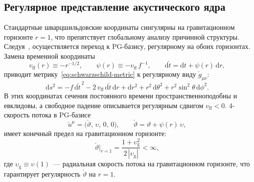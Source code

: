 \documentclass[12pt,a4paper,preprint]{elsarticle}
\begin{document}
        \subsection{Регулярное представление акустического ядра}\label{subsec:pg-core}
            Стандартные шварцшильдовские координаты сингулярны на гравитационном горизонте $r = 1$, что препятствует глобальному анализу причинной структуры. Следуя~\cite{SemyannikovAV_GlobalAcousticGeometryOfMichelFlowInPainleveGullstrandCoordinates_2026}, осуществляется переход к PG-базису, регулярному на обоих горизонтах. Замена временной координаты
            \begin{equation}
                v_{\mathrm{ff}}(r) \equiv -r^{-1/2}, \qquad \psi(r) \equiv -v_{\mathrm{ff}}\,f^{-1}, \qquad \mathrm{d}\check{t} = \mathrm{d}t + \psi(r)\,\mathrm{d}r,
                \label{eq:pg-transformation}
            \end{equation}
            приводит метрику~\eqref{eq:schwarzschild-metric} к регулярному виду $\check{g}_{\mu\nu}$:
            \begin{equation}
                \mathrm{d}s^{2} = -f\,\mathrm{d}\check{t}^{\,2} - 2\,v_{\mathrm{ff}}\,\mathrm{d}\check{t}\,\mathrm{d}r + \mathrm{d}r^{2} + r^{2}\,\mathrm{d}\theta^{2} + r^{2}\sin^{2}\!\theta\,\mathrm{d}\phi^{2}.
                \label{eq:pg-metric}
            \end{equation}
            В этих координатах сечения постоянного времени пространственноподобны и евклидовы, а свободное падение описывается регулярным сдвигом $v_{\mathrm{ff}} < 0$. 4-скорость потока в PG-базисе
            \begin{equation}
                \check{u}^{\mu} = \bigl(\check{\vartheta},\,\upsilon,\,0,\,0\bigr), \qquad \check{\vartheta} = \vartheta + \psi(r)\,\upsilon,
                \label{eq:four-velocity-pg}
            \end{equation}
            имеет конечный предел на гравитационном горизонте:
            \begin{equation}
                \check{\vartheta}\big|_{r=1} = \frac{1 + \upsilon_{\mathrm{g}}^{2}}{2\,|\upsilon_{\mathrm{g}}|} < \infty,
                \label{eq:vartheta-limit}
            \end{equation}
            где $\upsilon_{\mathrm{g}} \equiv \upsilon(1)$~--- радиальная скорость потока на гравитационном горизонте, что гарантирует регулярность $\check{\vartheta}$ на $r = 1$.
            
\end{document}
